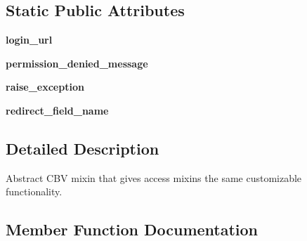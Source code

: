 \subsection*{Static Public Attributes}
\begin{DoxyCompactItemize}
\item 
\mbox{\label{classdjango_1_1contrib_1_1auth_1_1mixins_1_1_access_mixin_a625401db4c5668e054c56b4bb5747b6b}} 
{\bfseries login\+\_\+url}
\item 
\mbox{\label{classdjango_1_1contrib_1_1auth_1_1mixins_1_1_access_mixin_a9c17d71797999346d69c472237c4d924}} 
{\bfseries permission\+\_\+denied\+\_\+message}
\item 
\mbox{\label{classdjango_1_1contrib_1_1auth_1_1mixins_1_1_access_mixin_a4a43c1b4350cbddec22439b2bb47fbb2}} 
{\bfseries raise\+\_\+exception}
\item 
\mbox{\label{classdjango_1_1contrib_1_1auth_1_1mixins_1_1_access_mixin_a147cb74fc1d942518d0ff081a885da9a}} 
{\bfseries redirect\+\_\+field\+\_\+name}
\end{DoxyCompactItemize}


\subsection{Detailed Description}
\begin{DoxyVerb}Abstract CBV mixin that gives access mixins the same customizable
functionality.
\end{DoxyVerb}
 

\subsection{Member Function Documentation}
\mbox{\label{classdjango_1_1contrib_1_1auth_1_1mixins_1_1_access_mixin_a809d11be83e8147b6b6b6fedb8318ef6}} 
